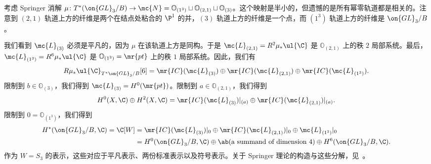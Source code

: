 \begin{exm}
    考虑 Springer 消解 \(\mu \colon T^*(\on{GL}_3/B) \to \mc{N} = \mathbb{O}_{(1^3)} \sqcup \mathbb{O}_{(2,1)} \sqcup \mathbb{O}_{(3)}\)。这个映射是半小的，但遗憾的是所有幂零轨道都是相关的。注意到 \((2,1)\) 轨道上方的纤维是两个在结点处粘合的 \(\P^1\) 的并，\((3)\) 轨道上方的纤维是一个点，而 \((1^3)\) 轨道上方的纤维是 \(\on{GL}_3/B\)。

    我们看到 \(\mc{L}_{(3)}\) 必须是平凡的，因为 \(\mu\) 在该轨道上方是同构。于是 \(\mc{L}_{(2,1)} = R^2 \mu_* \ul{\C}\) 是 \(\mathbb{O}_{(2,1)}\) 上的秩 \(2\) 局部系统。最后，\(\mc{L}_{(1^3)} = R^6 \mu_* \ul{\C}\) 是 \(\mathbb{O}_{(1^3)} = \mr{pt}\) 上的秩 \(1\) 局部系统。因此，我们有
    \[ R \mu_* \ul{\C}_{T^*\on{GL}_3/B}[6] = \mr{IC}(\mc{L}_{(3)}) \oplus \mr{IC}(\mc{L}_{(2,1)}) \oplus \mr{IC}(\mc{L}_{(1^3)}). \]
    限制到 \(b \in \mathbb{O}_{(3)}\)，我们得到 \(\mc{L}_{(3)} = H^0(\mr{pt})\)。限制到 \(a \in \mathbb{O}_{(2,1)}\)，我们得到
    \[ H^0(X, \C) \oplus H^2(X, \C) = \mr{IC}(\mc{L}_{(3)})|_{(a)} \oplus \mr{IC}(\mc{L}_{(2,1)})|_{(a)}. \]
    限制到 \(0 = \mathbb{O}_{(1^3)}\)，我们得到
    \begin{align*}
        H^*(\on{GL}_3/B, \C) = \C[W] &= \mr{IC}(\mc{L}_{(3)})|_0 \oplus \mr{IC}(\mc{L}_{(2,1)})|_0 \oplus \mc{L}_{(1^3)}|_0 \\
        &= H^0(\on{GL}_3/B, \C) \oplus \ab(\text{a summand of dimension } 4) \oplus H^6(\on{GL}_3/B, \C).
    \end{align*}
    作为 \(W = S_3\) 的表示，这些对应于平凡表示、两份标准表示以及符号表示。关于 Springer 理论的构造与这些分解，见~\cite{BorhoMacPherson1983}。
\end{exm}
